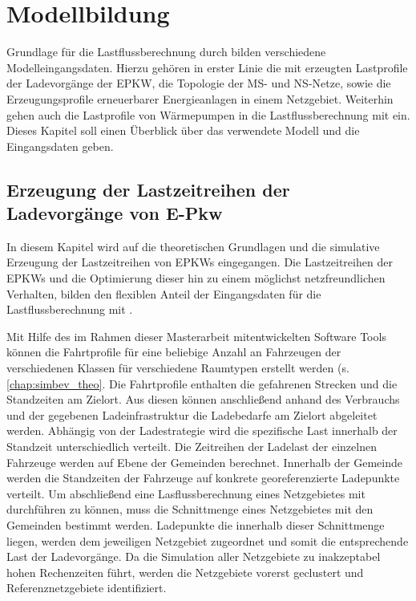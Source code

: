 
\section{Modellbildung}

Grundlage für die Lastflussberechnung durch \edisgo bilden verschiedene Modelleingangsdaten.
Hierzu gehören in erster Linie die mit \simbev erzeugten Lastprofile der Ladevorgänge der \gls{EPKW}, die Topologie der \gls{MS}- und \gls{NS}-Netze, sowie die Erzeugungsprofile erneuerbarer Energieanlagen in einem Netzgebiet.
Weiterhin gehen auch die Lastprofile von Wärmepumpen in die Lastflussberechnung mit ein.
Dieses Kapitel soll einen Überblick über das verwendete Modell und die Eingangsdaten geben.\medskip


\subsection{Erzeugung der Lastzeitreihen der Ladevorgänge von E-Pkw}

In diesem Kapitel wird auf die theoretischen Grundlagen und die simulative Erzeugung der Lastzeitreihen von \glspl{EPKW} eingegangen.
Die Lastzeitreihen der \glspl{EPKW} und die Optimierung dieser hin zu einem möglichst netzfreundlichen Verhalten, bilden den flexiblen Anteil der Eingangsdaten für die Lastflussberechnung mit \edisgo.\medskip

Mit Hilfe des im Rahmen dieser Masterarbeit mitentwickelten Software Tools \simbev können die Fahrtprofile für eine beliebige Anzahl an Fahrzeugen der verschiedenen Klassen für verschiedene Raumtypen erstellt werden (s. \autoref{chap:simbev_theo}.
Die Fahrtprofile enthalten die gefahrenen Strecken und die Standzeiten am Zielort.
Aus diesen können anschließend anhand des Verbrauchs und der gegebenen Ladeinfrastruktur die Ladebedarfe am Zielort abgeleitet werden.
Abhängig von der Ladestrategie wird die spezifische Last innerhalb der Standzeit unterschiedlich verteilt.
Die Zeitreihen der Ladelast der einzelnen Fahrzeuge werden auf Ebene der Gemeinden berechnet.
Innerhalb der Gemeinde werden die Standzeiten der Fahrzeuge auf konkrete georeferenzierte Ladepunkte verteilt.
Um abschließend eine Lasflussberechnung eines Netzgebietes mit \edisgo durchführen zu können, muss die Schnittmenge eines \dingo Netzgebietes mit den Gemeinden bestimmt werden.
Ladepunkte die innerhalb dieser Schnittmenge liegen, werden dem jeweiligen Netzgebiet zugeordnet und somit die entsprechende Last der Ladevorgänge.
Da die Simulation aller Netzgebiete zu inakzeptabel hohen Rechenzeiten führt, werden die \dingo Netzgebiete vorerst geclustert und Referenznetzgebiete identifiziert.


